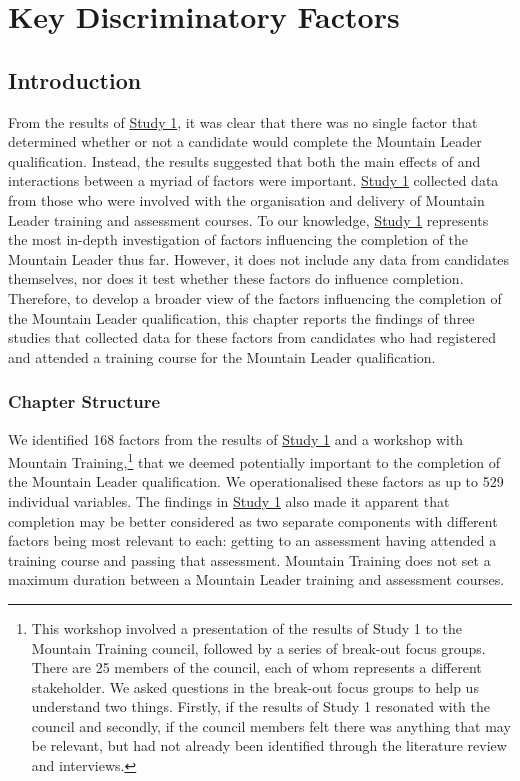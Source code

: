 \documentclass[
  12pt,
  a4paper,
]{book}
\begin{document}
\hypertarget{ml-pra}{%
\chapter{Key Discriminatory Factors}\label{ml-pra}}

\hypertarget{pra-introduction}{%
\section{Introduction}\label{pra-introduction}}

From the results of \protect\hyperlink{ml-qualitative}{Study 1}, it was clear that there was no single factor that determined whether or not a candidate would complete the Mountain Leader qualification. Instead, the results suggested that both the main effects of and interactions between a myriad of factors were important. \protect\hyperlink{ml-qualitative}{Study 1} collected data from those who were involved with the organisation and delivery of Mountain Leader training and assessment courses. To our knowledge, \protect\hyperlink{ml-qualitative}{Study 1} represents the most in-depth investigation of factors influencing the completion of the Mountain Leader thus far. However, it does not include any data from candidates themselves, nor does it test whether these factors do influence completion. Therefore, to develop a broader view of the factors influencing the completion of the Mountain Leader qualification, this chapter reports the findings of three studies that collected data for these factors from candidates who had registered and attended a training course for the Mountain Leader qualification.

\hypertarget{pra-chapter-structure}{%
\subsection{Chapter Structure}\label{pra-chapter-structure}}

We identified 168 factors from the results of \protect\hyperlink{ml-qualitative}{Study 1} and a workshop with Mountain Training,\footnote{This workshop involved a presentation of the results of Study 1 to the Mountain Training council, followed by a series of break-out focus groups. There are 25 members of the council, each of whom represents a different stakeholder. We asked questions in the break-out focus groups to help us understand two things. Firstly, if the results of Study 1 resonated with the council and secondly, if the council members felt there was anything that may be relevant, but had not already been identified through the literature review and interviews.} that we deemed potentially important to the completion of the Mountain Leader qualification. We operationalised these factors as up to 529 individual variables. The findings in \protect\hyperlink{ml-qualitative}{Study 1} also made it apparent that completion may be better considered as two separate components with different factors being most relevant to each: getting to an assessment having attended a training course and passing that assessment. Mountain Training does not set a maximum duration between a Mountain Leader training and assessment courses.
\end{document}

